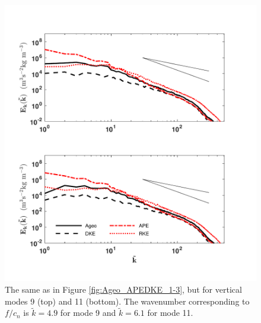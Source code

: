 \begin{figure}[H]
\includegraphics[scale=1]{Chapter4/img/Ageo_APEDKE_9-11}
\caption{The same as in Figure \ref{fig:Ageo_APEDKE_1-3}, but for vertical modes 9 (top) and 11 (bottom).  The wavenumber corresponding to $f/c_n$ is $\tilde{k} = 4.9$ for mode 9 and $\tilde{k} = 6.1$ for mode 11.}
\label{fig:Ageo_APEDKE_9-11}
\end{figure}

